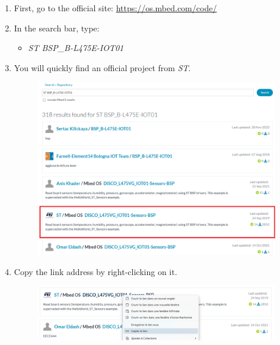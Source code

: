 \documentclass[10pt,a4paper,onecolumn]{article}
\begin{document}
\begin{enumerate}
    \item First, go to the official site: \url{https://os.mbed.com/code/}
    \item In the search bar, type:
    \begin{itemize}
        \item \textit{ST BSP\_B-L475E-IOT01}
    \end{itemize}
    \item You will quickly find an official project from \textit{ST}.
    
    \begin{figure}[H]
        \begin{center}
            \includegraphics[width=\dimexpr\textwidth-1cm\relax,height=\dimexpr0.25\textheight-1cm\relax,keepaspectratio]{images/7.png}
        \end{center}
    \end{figure}

    \item Copy the link address by right-clicking on it.
    
    \begin{figure}[H]
        \begin{center}
            \includegraphics[width=\dimexpr\textwidth-1cm\relax,height=\dimexpr0.25\textheight-1cm\relax,keepaspectratio]{images/8.png}
        \end{center}
    \end{figure}


\end{enumerate}
\end{document}
